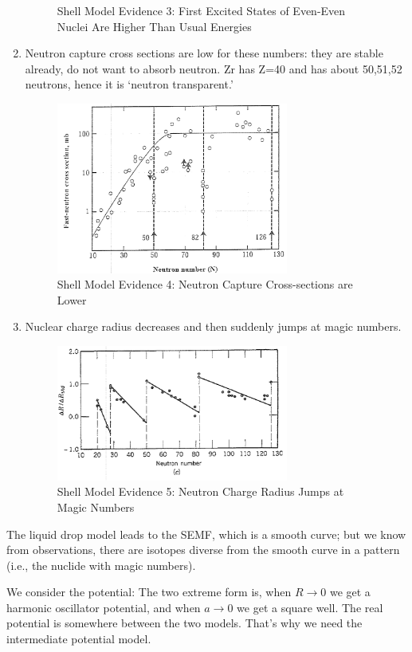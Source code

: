 \documentclass{school-22.101-notes}
\begin{document}
\begin{enumerate}
\begin{figure}
    \caption{Shell Model Evidence 3: First Excited States of Even-Even Nuclei Are Higher Than Usual Energies}
\end{figure}
\item Neutron capture cross sections are low for these numbers: they are stable already, do not want to absorb neutron. Zr has Z=40 and has about 50,51,52 neutrons, hence it is `neutron transparent.'
\begin{figure}
    \centering
    \includegraphics[width=3in]{images/shell/shell-evidence-4.png}
    \caption{Shell Model Evidence 4: Neutron Capture Cross-sections are Lower}
\end{figure}
\item Nuclear charge radius decreases and then suddenly jumps at magic numbers. 
\begin{figure}
    \centering
    \includegraphics[width=3in]{images/shell/shell-evidence-5.png}
    \caption{Shell Model Evidence 5: Neutron Charge Radius Jumps at Magic Numbers}
\end{figure}
\end{enumerate}


The liquid drop model leads to the SEMF, which is a smooth curve; but we know from observations, there are isotopes diverse from the smooth curve in a pattern (i.e., the nuclide with magic numbers). 


We consider the potential: The two extreme form is, when $R \to 0$ we get a harmonic oscillator potential, and when $a \to 0$ we get a square well. The real potential is somewhere between the two models. That's why we need the intermediate potential model. 
\end{document}
